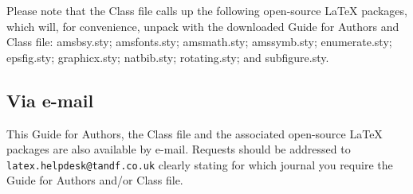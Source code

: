 \documentclass[]{cJEN2e}
\begin{document}
Please note that the Class file calls up the following open-source LaTeX packages, which will, for convenience,
unpack with the downloaded Guide for Authors and Class file: amsbsy.sty; amsfonts.sty; amsmath.sty; amssymb.sty; enumerate.sty; epsfig.sty; graphicx.sty; natbib.sty; rotating.sty; and subfigure.sty.

\subsection{Via e-mail}

This Guide for Authors, the Class file and the associated open-source LaTeX packages are also available by
e-mail. Requests should be addressed to {\tt latex.helpdesk@tandf.co.uk} clearly stating for which journal you
require the Guide for Authors and/or Class file.


\label{lastpage}
\end{document}
